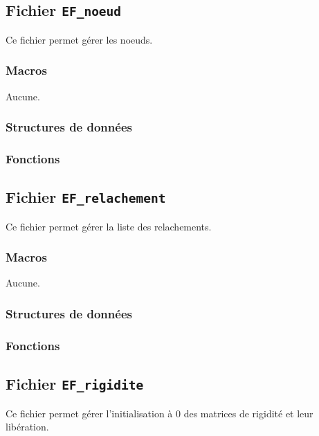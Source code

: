 \documentclass{article}
\begin{document}
\subsection{Fichier {\texttt{EF\_noeud}}}
Ce fichier permet gérer les noeuds.
\subsubsection{Macros}
Aucune.
\subsubsection{Structures de données}


\subsubsection{Fonctions}








\subsection{Fichier {\texttt{EF\_relachement}}}
Ce fichier permet gérer la liste des relachements.
\subsubsection{Macros}
Aucune.
\subsubsection{Structures de données}


\subsubsection{Fonctions}








\subsection{Fichier {\texttt{EF\_rigidite}}}
Ce fichier permet gérer l'initialisation à 0 des matrices de rigidité et leur libération.
\end{document}
